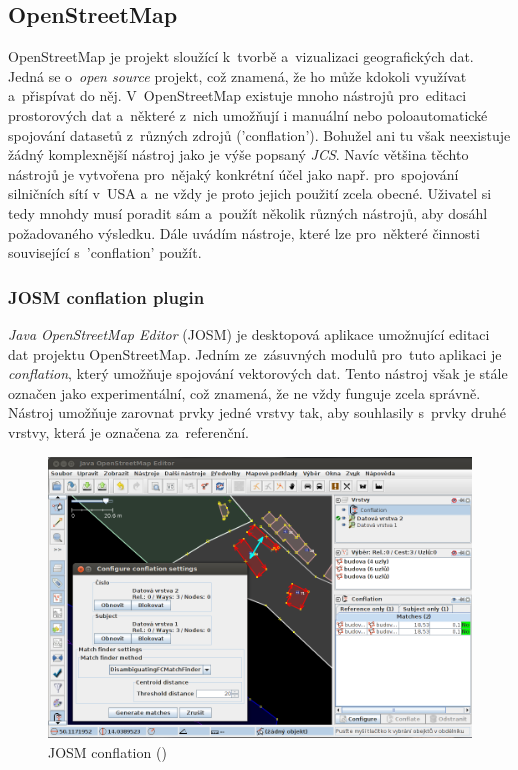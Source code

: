 
\subsection{OpenStreetMap}
\label{OSM}

OpenStreetMap je projekt sloužící k~tvorbě a~vizualizaci geografických dat. Jedná se o~\textit{open source} projekt, což znamená, že ho může kdokoli využívat a~přispívat do něj.
V~OpenStreetMap existuje mnoho nástrojů pro~editaci prostorových dat a~některé z~nich umožňují i manuální nebo poloautomatické spojování datasetů z~různých zdrojů ('conflation').
Bohužel ani tu však neexistuje žádný komplexnější nástroj jako je výše popsaný \textit{JCS}. Navíc většina těchto nástrojů je vytvořena pro~nějaký konkrétní účel jako např. 
pro~spojování silničních sítí v~USA a~ne vždy je proto jejich použití zcela obecné. Uživatel si tedy mnohdy musí poradit sám a~použít několik různých nástrojů, aby dosáhl
požadovaného výsledku. Dále uvádím nástroje, které lze pro~některé činnosti související s~'conflation' použít. 

\subsubsection{JOSM conflation plugin}

\textit{Java OpenStreetMap Editor} (JOSM) je desktopová aplikace umožnující editaci dat projektu OpenStreetMap. Jedním ze~zásuvných modulů pro~tuto aplikaci je \textit{conflation},
který umožňuje spojování vektorových dat. Tento nástroj však je stále označen jako experimentální, což znamená, že ne vždy funguje zcela správně. Nástroj umožňuje zarovnat
prvky jedné vrstvy tak, aby souhlasily s~prvky druhé vrstvy, která je označena za~referenční. 

\label{josmpic}
  \begin{figure}[hbt]
    \centering
      \includegraphics[width=350pt]{./pictures/josm.png}
      \caption{JOSM conflation ()}
      \label{fig:josm}
  \end{figure} 

